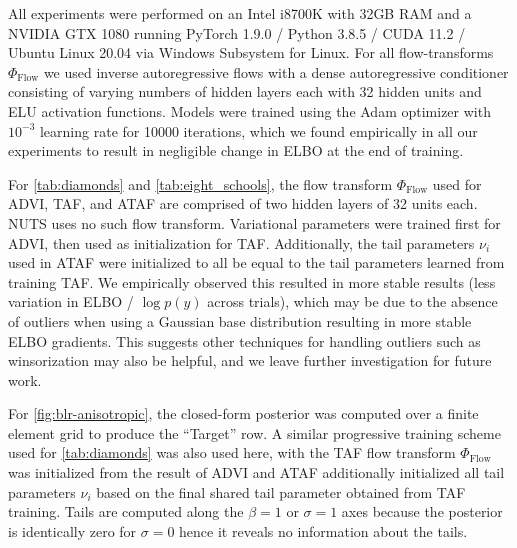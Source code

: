 \documentclass{article}
\theoremstyle{definition}
\theoremstyle{remark}
\begin{document}
All experiments were performed on an Intel i8700K with 32GB RAM and a NVIDIA GTX 1080
running PyTorch 1.9.0 / Python 3.8.5 / CUDA 11.2 / Ubuntu Linux 20.04 via Windows Subsystem for Linux.
For all flow-transforms $\Phi_{\text{Flow}}$ we used inverse autoregressive flows \citep{kingma2016improved} with a
dense autoregressive conditioner consisting of varying numbers of hidden layers each with 32 hidden units and
ELU activation functions. Models were trained using the Adam optimizer with $10^{-3}$ learning rate
for 10000 iterations, which we found empirically in all our experiments to result in negligible change in ELBO
at the end of training.

For \cref{tab:diamonds} and \cref{tab:eight_schools}, the flow transform $\Phi_{\text{Flow}}$ used for ADVI, TAF, and ATAF
are comprised of two hidden layers of 32 units each. NUTS uses no such flow transform. Variational parameters
were trained first for ADVI, then used as initialization for TAF. Additionally, the tail parameters $\nu_i$
used in ATAF were initialized to all be equal to the tail parameters learned from training TAF. We empirically observed
this resulted in more stable results (less variation in ELBO / $\log p(y)$ across trials), which may be due to
the absence of outliers when using a Gaussian base distribution resulting in more stable ELBO gradients. This suggests
other techniques for handling outliers such as winsorization may also be helpful, and we leave further investigation
for future work.


For \cref{fig:blr-anisotropic}, the closed-form posterior was computed over a finite element grid to produce
the ``Target'' row. A similar progressive training scheme used for \cref{tab:diamonds} was also used here, with
the TAF flow transform $\Phi_{\text{Flow}}$ was initialized from the result of ADVI and ATAF additionally initialized
all tail parameters $\nu_i$ based on the final shared tail parameter obtained from TAF training. Tails are computed
along the $\beta = 1$ or $\sigma = 1$ axes because the posterior is identically zero for $\sigma = 0$ hence it reveals
no information about the tails.
\end{document}
